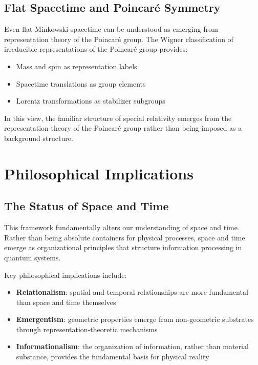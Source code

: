 \documentclass[12pt]{article}
\begin{document}
\subsection{Flat Spacetime and Poincaré Symmetry}

Even flat Minkowski spacetime can be understood as emerging from representation theory of the Poincaré group. The Wigner classification of irreducible representations of the Poincaré group provides:

\begin{itemize}
\item Mass and spin as representation labels
\item Spacetime translations as group elements
\item Lorentz transformations as stabilizer subgroups
\end{itemize}

In this view, the familiar structure of special relativity emerges from the representation theory of the Poincaré group rather than being imposed as a background structure.

\section{Philosophical Implications}

\subsection{The Status of Space and Time}

This framework fundamentally alters our understanding of space and time. Rather than being absolute containers for physical processes, space and time emerge as organizational principles that structure information processing in quantum systems.

Key philosophical implications include:

\begin{itemize}
\item \textbf{Relationalism}: spatial and temporal relationships are more fundamental than space and time themselves
\item \textbf{Emergentism}: geometric properties emerge from non-geometric substrates through representation-theoretic mechanisms
\item \textbf{Informationalism}: the organization of information, rather than material substance, provides the fundamental basis for physical reality
\end{itemize}
\end{document}
